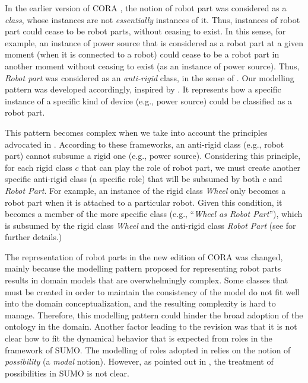 \documentclass[preprint,12pt]{elsarticle}
\begin{document}
In the earlier version of CORA \cite{prestes2013towards}, the notion of robot part was considered as a \emph{class}, whose instances are not \emph{essentially} instances of it. Thus, instances of robot part could cease to be robot parts, without ceasing to exist. In this sense, for example, an instance of power source that is considered as a robot part at a given moment (when it is connected to a robot) could cease to be a robot part in another moment without ceasing to exist (as an instance of power source). Thus, \textit{Robot part} was considered as an \emph{anti-rigid} class, in the sense of \cite{Guarino2009,Guizzardi2005}. Our modelling pattern \cite{prestes2013towards} was developed accordingly, inspired by \cite{Guizzardi2005}. It represents how a specific instance of a specific kind of device (e.g., power source) could be classified as a robot part.

This pattern becomes complex when we take into account the principles advocated in \cite{Guarino2009,Guizzardi2005}. According to these frameworks, an anti-rigid class (e.g., robot part) cannot subsume a rigid one (e.g., power source). Considering this principle, for each rigid class $c$ that can play the role of robot part, we must create another specific anti-rigid class (a specific role) that will be subsumed by both $c$ and \emph{Robot Part}. For example, an instance of the rigid class \emph{Wheel} only becomes a robot part when it is attached to a particular robot. Given this condition, it becomes a member of the more specific class (e.g., ``\emph{Wheel as Robot Part}''), which is subsumed by the rigid class \emph{Wheel} and the anti-rigid class \emph{Robot Part} (see \cite{prestes2013towards} for further details.)

The representation of robot parts in the new edition of CORA was changed, mainly because the modelling pattern proposed for representing robot parts results in domain models that are overwhelmingly complex. Some classes that must be created in order to maintain the consistency of the model do not fit well into the domain conceptualization, and the resulting complexity is hard to manage. Therefore, this modelling pattern could hinder the broad adoption of the ontology in the domain. Another factor leading to the revision was that it is not clear how to fit the dynamical behavior that is expected from roles in the framework of SUMO. The modelling of roles adopted in \cite{Guarino2009,Guizzardi2005} relies on the notion of \emph{possibility} (a \emph{modal} notion). However, as pointed out in \cite{oberle2007dolce}, the treatment of possibilities in SUMO is not clear.
\end{document}
